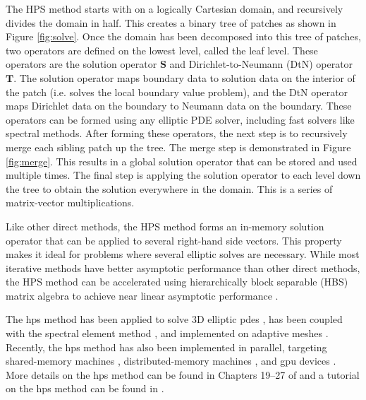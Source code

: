 The HPS method starts with on a logically Cartesian domain, and recursively divides the domain in half. This creates a binary tree of patches as shown in Figure \ref{fig:solve}. Once the domain has been decomposed into this tree of patches, two operators are defined on the lowest level, called the leaf level. These operators are the solution operator $\textbf{S}$ and Dirichlet-to-Neumann (DtN) operator $\textbf{T}$. The solution operator maps boundary data to solution data on the interior of the patch (i.e. solves the local boundary value problem), and the DtN operator maps Dirichlet data on the boundary to Neumann data on the boundary. These operators can be formed using any elliptic PDE solver, including fast solvers like spectral methods. After forming these operators, the next step is to recursively merge each sibling patch up the tree. The merge step is demonstrated in Figure \ref{fig:merge}. This results in a global solution operator that can be stored and used multiple times. The final step is applying the solution operator to each level down the tree to obtain the solution everywhere in the domain. This is a series of matrix-vector multiplications.

Like other direct methods, the HPS method forms an in-memory solution operator that can be applied to several right-hand side vectors. This property makes it ideal for problems where several elliptic solves are necessary. While most iterative methods have better asymptotic performance than other direct methods, the HPS method can be accelerated using hierarchically block separable (HBS) matrix algebra to achieve near linear asymptotic performance \citep{gillman2014direct}.

The \gls{hps} method has been applied to solve 3D elliptic \gls{pdes} \citep{hao2016direct}, has been coupled with the spectral element method \citep{fortunato2020ultraspherical}, and implemented on adaptive meshes \citep{babb2018accelerated, geldermans2019adaptive,chipman2024fast}. Recently, the \gls{hps} method has also been implemented in parallel, targeting shared-memory machines \citep{beams2020parallel}, distributed-memory machines \citep{yesypenko2022parallel}, and \gls{gpu} devices \citep{yesypenko2022gpu}. More details on the \gls{hps} method can be found in Chapters 19--27 of \citep{martinsson2019fast} and a tutorial on the \gls{hps} method can be found in \citep{martinsson2015hierarchical}.

